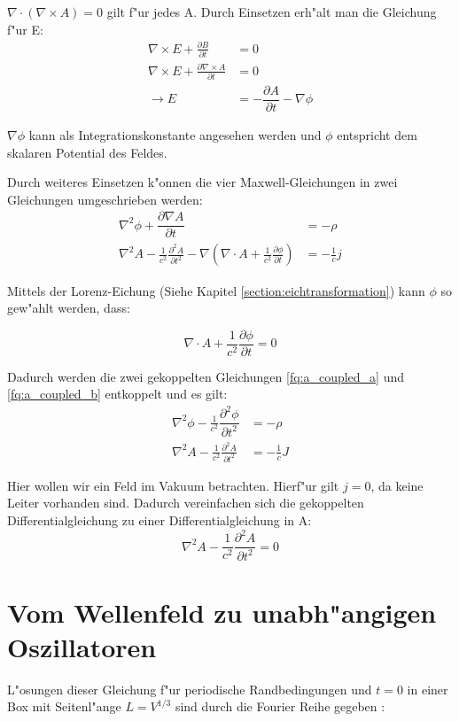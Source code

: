 $\nabla \cdot ( \nabla\times A ) = 0$ gilt f"ur jedes A. Durch Einsetzen erh"alt man die Gleichung f"ur E:
\begin{align}
\nabla\times E + \frac{\partial B }{\partial t} &= 0 \\
\nabla\times E + \frac{\partial \nabla\times A }{\partial t} &= 0 \\
\rightarrow E &= -\dfrac{\partial A}{\partial t} - \nabla \phi
\end{align}

$\nabla \phi$ kann als Integrationskonstante angesehen werden und $\phi$ entspricht dem skalaren Potential des Feldes.

Durch weiteres Einsetzen k"onnen die vier Maxwell-Gleichungen in zwei Gleichungen umgeschrieben werden:
\begin{align} 
 \label{fq:a_coupled_a}
 \nabla^2 \phi + \dfrac{\partial \nabla A}{\partial t} &= -\rho \\
 \label{fq:a_coupled_b}
 \nabla^2 A - \frac{1}{c^2} \frac{\partial^2 A }{\partial t^2} - \nabla \left( \nabla \cdot A + \frac{1}{c^2} \frac{\partial \phi }{\partial t} \right) &= - \frac{1}{c} j
\end{align}

Mittels der Lorenz-Eichung (Siehe Kapitel \ref{section:eichtransformation}) kann $\phi$ so gew"ahlt werden, dass:

\begin{equation}
\nabla \cdot A + \frac{1}{c^2} \frac{\partial \phi }{\partial t} = 0
\end{equation}

Dadurch werden die zwei gekoppelten Gleichungen \ref{fq:a_coupled_a} und \ref{fq:a_coupled_b} entkoppelt und es gilt:
\begin{align}
\nabla^2 \phi - \frac{1}{c^2} \dfrac{\partial^2 \phi}{\partial t^2} &= -\rho \\
\nabla^2 A - \frac{1}{c^2} \frac{\partial^2 A }{\partial t^2} &= - \frac{1}{c} J
\end{align}

Hier wollen wir ein Feld im Vakuum betrachten. Hierf"ur gilt $j = 0$, da keine Leiter vorhanden sind.
Dadurch vereinfachen sich die gekoppelten Differentialgleichung zu einer Differentialgleichung in A:
\begin{equation} \label{fq:wave_dgl}
\nabla^2 A - \frac{1}{c^2} \frac{\partial^2 A }{\partial t^2} = 0
\end{equation}

\section{Vom Wellenfeld zu unabh"angigen Oszillatoren}
L"osungen dieser Gleichung f"ur periodische Randbedingungen und $t=0$ in einer Box mit Seitenl"ange $L = V^{1/3}$ sind durch die Fourier Reihe gegeben \cite{fq:em_wave_eq}:

